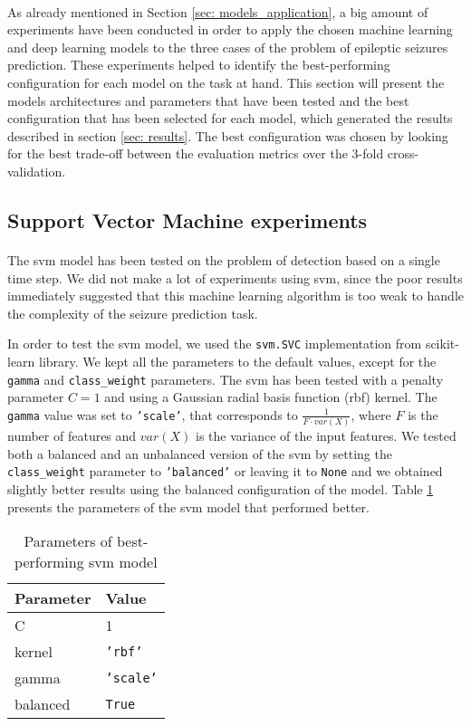 \paragraph{} As already mentioned in Section \ref{sec: models_application}, a big amount of experiments have been conducted in order to apply the chosen machine learning and deep learning models to the three cases of the problem of epileptic seizures prediction. These experiments helped to identify the best-performing configuration for each model on the task at hand. This section will present the models architectures and parameters that have been tested and the best configuration that has been selected for each model, which generated the results described in section \ref{sec: results}. The best configuration was chosen by looking for the best trade-off between the evaluation metrics over the 3-fold cross-validation.

\subsection{Support Vector Machine experiments}
\paragraph{} The \acs{svm} model has been tested on the problem of detection based on a single time step. We did not make a lot of experiments using \acs{svm}, since the poor results immediately suggested that this machine learning algorithm is too weak to handle the complexity of the seizure prediction task.

In order to test the \acs{svm} model, we used the \texttt{svm.SVC} implementation from scikit-learn library. We kept all the parameters to the default values, except for the \texttt{gamma} and \texttt{class\_weight} parameters. The \acs{svm} has been tested with a penalty parameter $C=1$ and using a Gaussian radial basis function (\acs{rbf}) kernel. The \texttt{gamma} value was set to \texttt{'scale'}, that corresponds to $\frac{1}{F \cdot var(X)}$, where $F$ is the number of features and $var(X)$ is the variance of the input features. We tested both a balanced and an unbalanced version of the \acs{svm} by setting the \texttt{class\_weight} parameter to \texttt{'balanced'} or leaving it to \texttt{None} and we obtained slightly better results using the balanced configuration of the model. Table \ref{tab:svm_param} presents the parameters of the \acs{svm} model that performed better.
\begin{table}[htbp]
    \centering
    \begin{tabular}{ll}
        \hline
        \textbf{Parameter}  & \textbf{Value} \\\hline
        C                   & 1 \\
        kernel              & \texttt{'rbf'} \\
        gamma               & \texttt{'scale'} \\
        balanced            & \texttt{True} \\\hline
    \end{tabular}
    \caption{Parameters of best-performing \acs{svm} model}
    \label{tab:svm_param}
\end{table}

